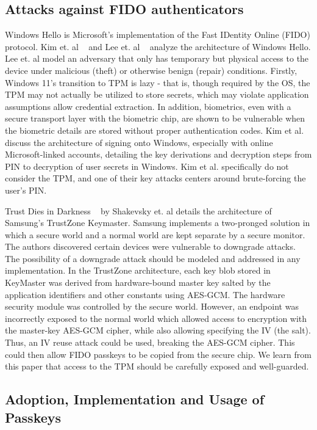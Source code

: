 \documentclass[letterpaper,twocolumn,10pt]{article}
\begin{document}
\subsection{Attacks against FIDO authenticators}

Windows Hello is Microsoft's implementation of the Fast IDentity Online (FIDO) protocol. Kim et. al ~\cite{https://doi.org/10.1155/2021/6245306}  and Lee et. al ~\cite{11391923}
analyze the architecture of Windows Hello. Lee et. al model an adversary that only has temporary but physical access to the device under malicious (theft) or otherwise benign (repair) conditions. Firstly, Windows 11's transition to TPM is lazy - that is, though required by the OS, the TPM may not actually be utilized to store secrets, which may violate application assumptions allow credential extraction. In addition, biometrics, even with a secure transport layer with the biometric chip, are shown to be vulnerable when the biometric details are stored without proper authentication codes. Kim et al. discuss the architecture of signing onto Windows, especially with online Microsoft-linked accounts, detailing the key derivations and decryption steps from PIN to decryption of user secrets in Windows. Kim et al. specifically do not consider the TPM, and one of their key attacks centers around brute-forcing the user's PIN.

Trust Dies in Darkness ~\cite{shakevsky2022trust} by Shakevsky et. al details the architecture of Samsung's TrustZone Keymaster. Samsung implements a two-pronged solution in which a secure world and a normal world are kept separate by a secure monitor. The authors discovered certain devices were vulnerable to downgrade attacks. The possibility of a downgrade attack should be modeled and addressed in any implementation. In the TrustZone architecture, each key blob stored in KeyMaster was derived from hardware-bound master key salted by the application identifiers and other constants using AES-GCM. The hardware security module was controlled by the secure world. However, an endpoint was incorrectly exposed to the normal world which allowed access to encryption with the master-key AES-GCM cipher, while also allowing specifying the IV (the salt). Thus, an IV reuse attack could be used, breaking the AES-GCM cipher. This could then allow FIDO passkeys to be copied from the secure chip. We learn from this paper that access to the TPM should be carefully exposed and well-guarded.

\subsection{Adoption, Implementation and Usage of Passkeys}
\end{document}

